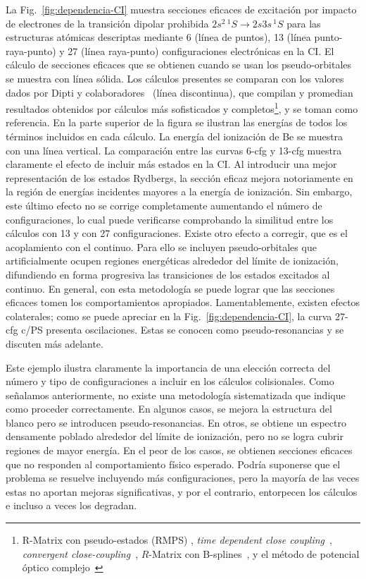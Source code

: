 La Fig.~\ref{fig:dependencia-CI} muestra secciones eficaces de 
excitación por impacto de electrones de la transición dipolar prohibida
$2s^2\,^1S\rightarrow 2s3s\,^1S$ para las estructuras atómicas 
descriptas mediante 6 (línea de puntos), 13 (línea punto-raya-punto) y 
27 (línea raya-punto) configuraciones electrónicas en la CI. El cálculo 
de secciones eficaces que se obtienen cuando se usan los 
pseudo-orbitales se muestra con línea sólida. Los cálculos presentes se 
comparan con los valores dados por Dipti y colaboradores~\cite{Dipti:19}
(línea discontinua), que compilan y promedian resultados obtenidos por 
cálculos más sofisticados y completos\footnote{R-Matrix con 
pseudo-estados (RMPS) \cite{Be_Ballance:03,Bartschat:97}, \textit{time 
dependent close coupling}~\cite{Colgan:03}, \textit{convergent 
close-coupling}~\cite{Fursa:97,Bray:15}, $R$-Matrix con 
B-splines~\cite{Zatsarinny:16}, y el método de potencial óptico 
complejo~\cite{Blanco:17}}, y se toman como referencia. 
En la parte superior de la figura se ilustran las energías de todos los 
términos incluidos en cada cálculo. La energía del ionización de Be se 
muestra con una línea vertical. 
La comparación entre las curvas 6-cfg y 13-cfg muestra claramente el 
efecto de incluir más estados en la CI. Al introducir una mejor 
representación de los estados Rydbergs, la sección eficaz mejora 
notoriamente en la región de energías incidentes mayores a la energía de 
ionización. Sin embargo, este último efecto no se corrige completamente
aumentando el número de configuraciones, lo cual puede verificarse 
comprobando la similitud entre los cálculos con 13 y con 27 
configuraciones.
Existe otro efecto a corregir, que es el acoplamiento con el continuo. 
Para ello se incluyen pseudo-orbitales que artificialmente ocupen 
regiones energéticas alrededor del límite de ionización, difundiendo en 
forma progresiva las transiciones de los estados excitados al continuo. 
En general, con esta metodología se puede lograr que las secciones 
eficaces tomen los comportamientos apropiados. Lamentablemente, existen 
efectos colaterales; como se puede apreciar en la 
Fig.~\ref{fig:dependencia-CI}, la curva 27-cfg c/PS presenta 
oscilaciones. Estas se conocen como pseudo-resonancias y se discuten más 
adelante. 

Este ejemplo ilustra claramente la importancia de una elección correcta 
del número y tipo de configuraciones a incluir en los cálculos 
colisionales. 
Como señalamos anteriormente, no existe una metodología sistematizada 
que indique como proceder correctamente. En algunos casos, se mejora la 
estructura del blanco pero se introducen pseudo-resonancias. En otros, 
se obtiene un espectro densamente poblado alrededor del límite de 
ionización, pero no se logra cubrir regiones de mayor energía. En el 
peor de los casos, se obtienen secciones eficaces que no 
responden al comportamiento físico esperado. Podría suponerse que el 
problema se resuelve incluyendo más configuraciones, pero la mayoría de 
las veces estas no aportan mejoras significativas, y por el contrario, 
entorpecen los cálculos e incluso a veces los degradan. 

